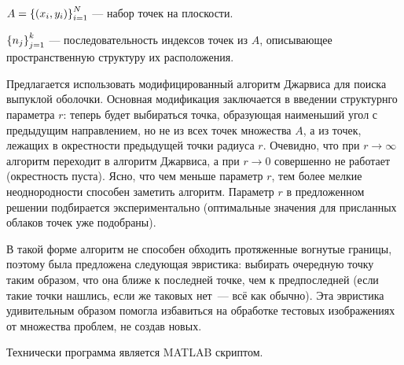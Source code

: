 






 $A = \left\{\left(x_i, y_i\right)\right\}_{i=1}^N$ --- набор точек на плоскости.

 $\left\{n_j\right\}_{j=1}^k$ --- последовательность индексов точек из $A$, описывающее пространственную структуру их расположения.

Предлагается использовать модифицированный алгоритм Джарвиса для поиска выпуклой оболочки. 
Основная модификация заключается в введении структурнго параметра  $r$: теперь будет выбираться точка, образующая наименьший угол с предыдущим направлением, но не из всех точек множества $A$, а из точек, лежащих в окрестности предыдущей точки радиуса $r$. 
Очевидно, что при $r\to\infty$ алгоритм переходит в алгоритм Джарвиса, а при $r\to0$ совершенно не работает (окрестность пуста). 
Ясно, что чем меньше параметр $r$, тем более мелкие неоднородности способен заметить алгоритм.
Параметр $r$ в предложенном решении подбирается экспериментально (оптимальные значения для присланных облаков точек уже подобраны).

В такой форме алгоритм не способен обходить протяженные вогнутые границы, поэтому была предложена следующая эвристика: выбирать очередную точку таким образом, что она ближе к последней точке, чем к предпоследней (если такие точки нашлись, если же таковых нет~--- всё как обычно). 
Эта эвристика удивительным образом помогла избавиться на обработке тестовых изображениях от множества проблем, не создав новых.

Технически программа является MATLAB скриптом. 
 
